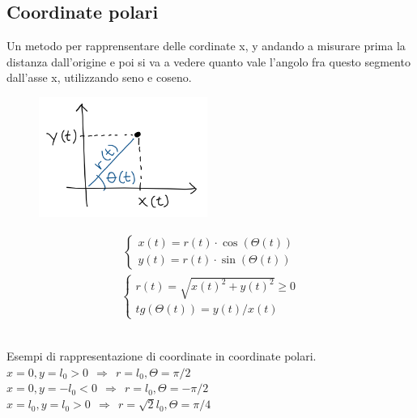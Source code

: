 \subsection{Coordinate polari}
Un metodo per rapprensentare delle cordinate x, y andando a misurare prima la distanza dall'origine e poi si va a vedere
quanto vale l'angolo fra questo segmento dall'asse x, utilizzando seno e coseno.
\begin{figure}
    \centering
    \includegraphics[width=5.5cm]{images/coordinate-polari.png}
\end{figure}
\begin{align*}
    \begin{cases}
        x(t) = r(t) \cdot \cos(\Theta(t))\\
        y(t) = r(t) \cdot \sin(\Theta(t)) 
    \end{cases}
\end{align*}
\begin{align*}
    \begin{cases}
        r(t) = \sqrt{x(t)^2 + y(t)^2} \geq 0\\
        tg(\Theta(t)) = y(t) / x(t) 
    \end{cases}
\end{align*}
\\
\begin{example} Esempi di rappresentazione di coordinate in coordinate polari.\\
    $x = 0, y = l_0 > 0 \:\: \Rightarrow \:\: r = l_0, \Theta = \pi/2$\\
    $x = 0, y = -l_0 < 0 \:\: \Rightarrow \:\: r = l_0, \Theta = -\pi/2$\\
    $x = l_0, y = l_0 > 0 \:\: \Rightarrow \:\: r = \sqrt{2}l_0, \Theta = \pi/4$\\
\end{example}

